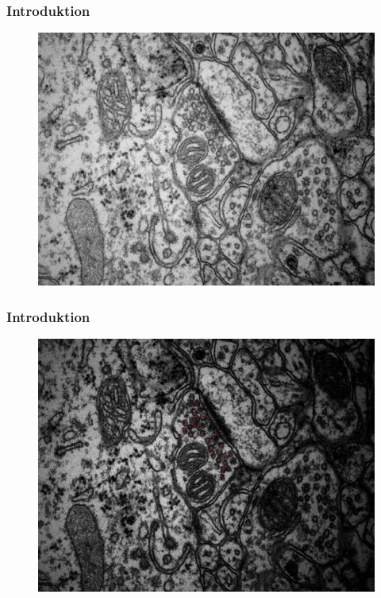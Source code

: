 \documentclass[12pt,t]{beamer}
\begin{document}
\begin{frame}
\frametitle{Introduktion}
\begin{figure}[H]
\includegraphics[scale=0.4]{img/orig/AN2-3_7.jpg}
\end{figure}
\end{frame}

\begin{frame}
\frametitle{Introduktion}
\begin{figure}[H]
\includegraphics[scale=0.4]{img/orig/AN2-3_7_new.jpg}
\end{figure}
\end{frame}
\end{document}
